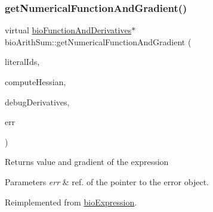 \mbox{\label{classbio_arith_sum_afe9b54bab626e9dbe2b3aefebbcb6f8f}} 
\subsubsection{\texorpdfstring{get\+Numerical\+Function\+And\+Gradient()}{getNumericalFunctionAndGradient()}\hspace{0.1cm}{\footnotesize\ttfamily [3/4]}}
{\footnotesize\ttfamily virtual \hyperlink{classbio_function_and_derivatives}{bio\+Function\+And\+Derivatives}$\ast$ bio\+Arith\+Sum\+::get\+Numerical\+Function\+And\+Gradient (\begin{DoxyParamCaption}\item[{vector$<$ pat\+U\+Long $>$}]{literal\+Ids,  }\item[{pat\+Boolean}]{compute\+Hessian,  }\item[{pat\+Boolean}]{debug\+Derivatives,  }\item[{pat\+Error $\ast$\&}]{err }\end{DoxyParamCaption})\hspace{0.3cm}{\ttfamily [virtual]}}

\begin{DoxyReturn}{Returns}
value and gradient of the expression 
\end{DoxyReturn}

\begin{DoxyParams}{Parameters}
{\em err} & ref. of the pointer to the error object. \\
\hline
\end{DoxyParams}


Reimplemented from \hyperlink{classbio_expression_a91c81ce80c9e972c913b10f5f3c1ed13}{bio\+Expression}.

\mbox{\label{classbio_arith_sum_afe9b54bab626e9dbe2b3aefebbcb6f8f}} 
